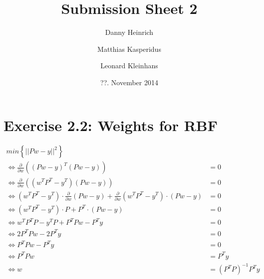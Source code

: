 \documentclass{scrartcl}
\title{Submission Sheet 2}
\author{Danny Heinrich \and Matthias Kasperidus \and Leonard Kleinhans}
\date{??. November 2014}
\begin{document}
\maketitle

\section{Exercise 2.2: Weights for RBF}

\begin{align*}
  min \left\{ || P w-y ||^2\right\} &\\
 \Leftrightarrow  \frac{\partial}{\partial w} \left( (P w-y)^T (P w-y)\right) & = 0 \\
 \Leftrightarrow  \frac{\partial}{\partial w} \left( (w^T P^T -y^T) (P w-y)\right) & = 0 \\
 \Leftrightarrow  (w^T P^T -y^T) \cdot \frac{\partial}{\partial w} \left( P w-y\right) + \frac{\partial}{\partial w} \left( w^T P^T -y^T \right) \cdot (P w-y) & = 0 \\
 \Leftrightarrow  (w^T P^T -y^T) \cdot  P + P^T \cdot (P w-y) & = 0 \\
 \Leftrightarrow  w^T P^T P - y^T P + P^T P w - P^T y & = 0  \\
 \Leftrightarrow  2 P^T P w - 2 P^T y & = 0 \\
 \Leftrightarrow  P^T P w - P^T y & = 0 \\
 \Leftrightarrow  P^T P w & = P^T y \\
 \Leftrightarrow w & = (P^T P)^{-1} P^T y
\end{align*}
\end{document}

